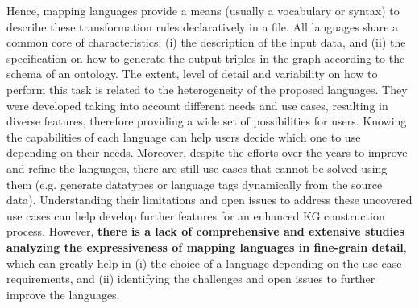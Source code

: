 
 Hence, mapping languages provide a means (usually a vocabulary or syntax) to describe these transformation rules declaratively in a file. 
 All languages share a common core of characteristics: (i) the description of the input data, and (ii) the specification on how to generate the output triples in the graph according to the schema of an ontology. 
 The extent, level of detail and variability on how to perform this task is related to the heterogeneity of the proposed languages. 
 They were developed taking into account different needs and use cases, resulting in diverse features, therefore providing a wide set of possibilities for users.
 Knowing the capabilities of each language can help users decide which one to use depending on their needs. 
 Moreover, despite the efforts over the years to improve and refine the languages, there are still use cases that cannot be solved using them (e.g. generate datatypes or language tags dynamically from the source data). 
 Understanding their limitations and open issues to address these uncovered use cases can help develop further features for an enhanced KG construction process.
 However, \textbf{there is a lack of comprehensive and extensive studies analyzing the expressiveness of mapping languages in fine-grain detail}, which can greatly help in (i) the choice of a language depending on the use case requirements, and (ii) identifying the challenges and open issues to further improve the languages. 
 


